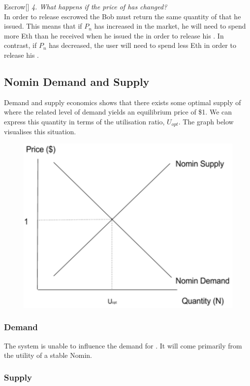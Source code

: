 \begin{namedthm*}{Escrow}[]
\noindent \emph{4. What happens if the price of \NOM{} has changed?} \\ 

\noindent In order to release escrowed \HAV{} the Bob must return the same quantity of \NOM{} that he issued. This means that if $P_n$ has increased in the market, he will need to spend more Eth than he received when he issued the \NOM{} in order to release his \HAV{}. In contrast, if $P_n$ has decreased, the user will need to spend less Eth in order to release his \HAV{}.

\newpage

\subsection{Nomin Demand and Supply} 

\noindent Demand and supply economics shows that there exists some optimal supply of \NOM{} where the related level of demand yields an equilibrium price of \$1. We can express this quantity in terms of the utilisation ratio, $U_{opt}$. The graph below visualises this situation. \\

\begin{figure}[h!]
    \centering
    \includegraphics[width=.7\textwidth]{img/nomin-demand-vs-supply}
\end{figure}

\subsubsection*{Demand}

\noindent The system is unable to influence the demand for \NOM{}. It will come primarily from the utility of a stable Nomin.

\subsubsection*{Supply}


\end{namedthm*}
